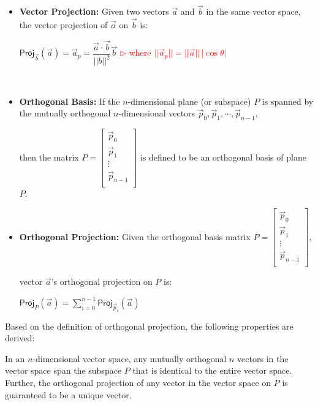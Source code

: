 \begin{tcolorbox}[title={\textbf{\tboxdef{\ref*{subsec:projection}} Vector and Orthogonal Projections}}]

\begin{itemize}

\item \textbf{Vector Projection:} Given two vectors $\vec{a}$ and $\vec{b}$ in the same vector space, the vector projection of $\vec{a}$ on $\vec{b}$ is:

$\textsf{Proj}_{\vec{b}}(\vec{a}) = \vec{a}_p  = \dfrac{\vec{a} \cdot \vec{b}}{||b||^2} \vec{b}$ \textcolor{red}{ $\rhd$ where $||\vec{a}_p|| = ||\vec{a}||\,|\cos \theta|$}

$ $

\item \textbf{Orthogonal Basis:} If the $n$-dimensional plane (or subspace) $P$ is spanned by the mutually orthogonal $n$-dimensional vectors $\vec{p}_0, \vec{p}_1, \cdots, \vec{p}_{n-1}$, 

then the matrix $P = \begin{bmatrix} 
\vec{p}_0\\
\vec{p}_1\\
\vdots\\
\vec{p}_{n-1}\\
\end{bmatrix}
$
is defined to be an orthogonal basis of plane $P$. 


\item \textbf{Orthogonal Projection:} Given the orthogonal basis matrix $P = \begin{bmatrix} 
\vec{p}_0\\
\vec{p}_1\\
\vdots\\
\vec{p}_{n-1}\\
\end{bmatrix}
$, 

vector $\vec{a}$'s orthogonal projection on $P$ is:

$\textsf{Proj}_P(\vec{a}) = \sum\limits_{i=0}^{n-1} \textsf{Proj}_{\vec{p}_i}(\vec{a})$



\end{itemize}


\end{tcolorbox}


Based on the definition of orthogonal projection, the following properties are derived:  

 In an $n$-dimensional vector space, any mutually orthogonal $n$ vectors in the vector space span the subspace $P$ that is identical to the entire vector space. Further, the orthogonal projection of any vector in the vector space on $P$ is guaranteed to be a unique vector.

